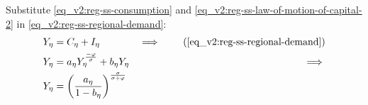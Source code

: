 \documentclass[../thesis.tex]{subfiles}
\begin{document}

Substitute \ref{eq_v2:reg-ss-consumption} and \ref{eq_v2:reg-ss-law-of-motion-of-capital-2} in \ref{eq_v2:reg-ss-regional-demand}:
\begin{alignat}{2}
	Y_{\eta} &= C_{\eta} + I_{\eta} &\implies \tag{\ref{eq_v2:reg-ss-regional-demand}} \\
	Y_{\eta} &= a_{\eta} Y_{\eta}^{\frac{-\varphi}{\sigma}} + b_{\eta} Y_{\eta} &\implies \nonumber \\
	Y_{\eta} &= \left( \frac{a_{\eta}}{1 - b_{\eta}} \right)^{\frac{\sigma}{\sigma + \varphi}} \label{eq_v2:reg-ss-yn}
\end{alignat}


\begin{comment}
	
	Substitute \ref{eq_v2:reg-ss-int-good-firm-FOC-Kt-2} in \ref{eq_v2:reg-ss-law-of-motion-for-capital}:
	\begin{align}
		I_{\eta} &= \delta K_{\eta} \implies I_{\eta} = \delta {\alpha_{\eta}} \frac{\Lambda_{}}{R_K} Y_{\eta} \implies \tag{\ref{eq_v2:reg-ss-law-of-motion-for-capital}} \\
		I_{\eta} &= b_{\eta} Y_{\eta} \label{eq_v2:reg-ss-investment} \\
		& \text{where:} \quad b_{\eta} = \delta {\alpha_{\eta}} \frac{\Lambda_{}}{R_K} \label{eq_v2:reg-ss-b-eta}
	\end{align}
	
\end{comment}

\end{document}
